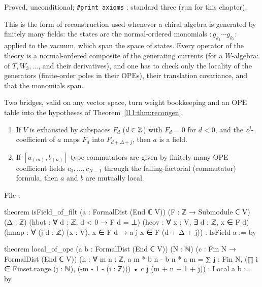 \begin{status}
Proved, unconditional; \texttt{\#print axioms} \allowbreak{}\allowbreak{}\allowbreak{}\allowbreak{}: standard three (run for this
chapter).
\end{status}

\begin{physics}
This is the form of reconstruction used whenever a chiral algebra is generated by finitely many fields: the states are the
normal-ordered monomials ${:}g_{k_1}\cdots g_{k_r}{:}$ applied to the vacuum, which span the space of states. Every operator of the
theory is a normal-ordered composite of the generating currents (for a $W$-algebra: of $T,W_3,\dots$, and their derivatives), and
one has to check only the locality of the generators (finite-order poles in their OPEs), their translation covariance, and that
the monomials span.
\end{physics}

Two bridges, valid on any vector space, turn weight bookkeeping and an OPE table into the hypotheses of
Theorem~\ref{l11:thm:recongen}.

\begin{theorem}\label{l11:thm:bridges}
\begin{enumerate}
\item If $V$ is exhausted by subspaces $F_d$ ($d\in{\mathbb{Z}}$) with $F_d = 0$ for $d<0$, and the $z^j$-coefficient of $a$ maps $F_d$ into
  $F_{d+\Delta+j}$, then $a$ is a field.
\item If $[a_{(m)},b_{(n)}]$-type commutators are given by finitely many OPE coefficient fields $c_0,\dots,c_{N-1}$ through the
  falling-factorial (commutator) formula, then $a$ and $b$ are mutually local.
\end{enumerate}
\end{theorem}
\noindent File .
\begin{leancode}
theorem isField_of_filt (a : FormalDist (End ℂ V)) (F : ℤ → Submodule ℂ V) (Δ : ℤ)
    (hbot : ∀ d : ℤ, d < 0 → F d = ⊥)
    (hcov : ∀ x : V, ∃ d : ℤ, x ∈ F d)
    (hmap : ∀ (j d : ℤ) (x : V), x ∈ F d → a j x ∈ F (d + Δ + j)) :
    IsField a := by

theorem local_of_ope (a b : FormalDist (End ℂ V)) (N : ℕ) (c : Fin N → FormalDist (End ℂ V))
    (h : ∀ m n : ℤ, a m * b n - b n * a m
        = ∑ j : Fin N, (∏ i ∈ Finset.range (j : ℕ), (-m - 1 - (i : ℤ))) • c j (m + n + 1 + j)) :
    Local a b := by
\end{leancode}

